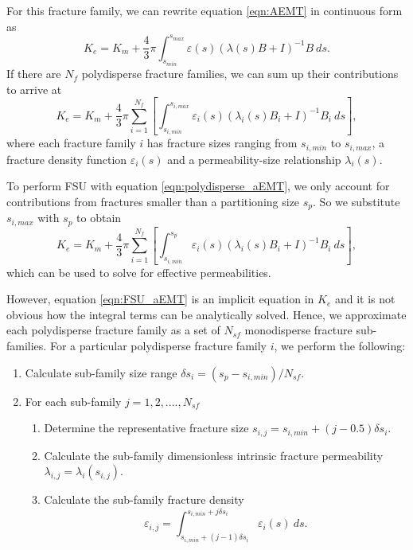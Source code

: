 \documentclass[draft]{agujournal2018}
\begin{document}
For this fracture family, we can rewrite equation \ref{eqn:AEMT} in continuous form as
\begin{equation}
K_e =  K_m + \frac{4}{3} \pi \int_{s_{min}}^{s_{max}} \varepsilon (s) \left(\lambda (s) B + I\right)^{-1}B\ ds.
\end{equation}
If there are $N_f$ polydisperse fracture families, we can sum up their contributions to arrive at
\begin{equation}
\label{eqn:polydisperse_aEMT}
K_e =  K_m + \frac{4}{3} \pi \sum_{i=1}^{N_f} \left[ \int_{s_{i,min}}^{s_{i,max}} \varepsilon_i (s) \left(\lambda_i (s) B_i + I\right)^{-1}B_i\ ds \right],
\end{equation}
where each fracture family $i$ has fracture sizes ranging from $s_{i,min}$ to $s_{i,max}$, a fracture density function $\varepsilon_i (s)$ and a permeability-size relationship $\lambda_i (s)$.

To perform FSU with equation \ref{eqn:polydisperse_aEMT}, we only account for contributions from fractures smaller than a partitioning size $s_p$. So we substitute $s_{i,max}$ with $s_p$ to obtain
\begin{equation}
\label{eqn:FSU_aEMT}
K_e =  K_m + \frac{4}{3} \pi \sum_{i=1}^{N_f} \left[ \int_{s_{i,min}}^{s_p} \varepsilon_i (s) \left(\lambda_i (s) B_i + I\right)^{-1}B_i\ ds \right],
\end{equation}
which can be used to solve for effective permeabilities. 

However, equation \ref{eqn:FSU_aEMT} is an implicit equation in $K_e$ and it is not obvious how the integral terms can be analytically solved. Hence, we approximate each polydisperse fracture family as a set of $N_{sf}$ monodisperse fracture sub-families. For a particular polydisperse fracture family $i$, we perform the following:

\begin{enumerate}
	\item Calculate sub-family size range $\delta s_i = \left(s_p - s_{i,min}\right)/N_{sf}$.
	\item For each sub-family $j=1,2,....,N_{sf}$
	\begin{enumerate}
		\item Determine the representative fracture size $s_{i,j} = s_{i,min} + \left(j-0.5\right) \delta s_i$.
		\item Calculate the sub-family dimensionless intrinsic fracture permeability $\lambda_{i,j}=\lambda_i(s_{i,j})$.
		\item Calculate the sub-family fracture density $$\varepsilon_{i,j}=\int_{ s_{i,min} + \left(j-1\right) \delta s_i}^{ s_{i,min} + j\delta s_i} \varepsilon_i (s)\ ds.$$
	\end{enumerate}	
\end{enumerate}
\end{document}
